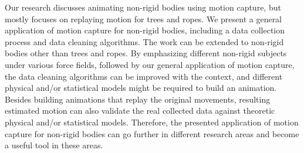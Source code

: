 Our research discusses animating non-rigid bodies using motion capture, but mostly focuses on replaying motion for trees and ropes. We present a general application of motion capture for non-rigid bodies, including a data collection process and data cleaning algorithms. The work can be extended to non-rigid bodies other than trees and ropes. By emphasizing different non-rigid subjects under various force fields, followed by our general application of motion capture, the data cleaning algorithms can be improved with the context, and different physical and/or statistical models might be required to build an animation. Besides building animations that replay the original movements, resulting estimated motion can also validate the real collected data against theoretic physical and/or statistical models. Therefore, the presented application of motion capture for non-rigid bodies can go further in different research areas and become a useful tool in these areas.